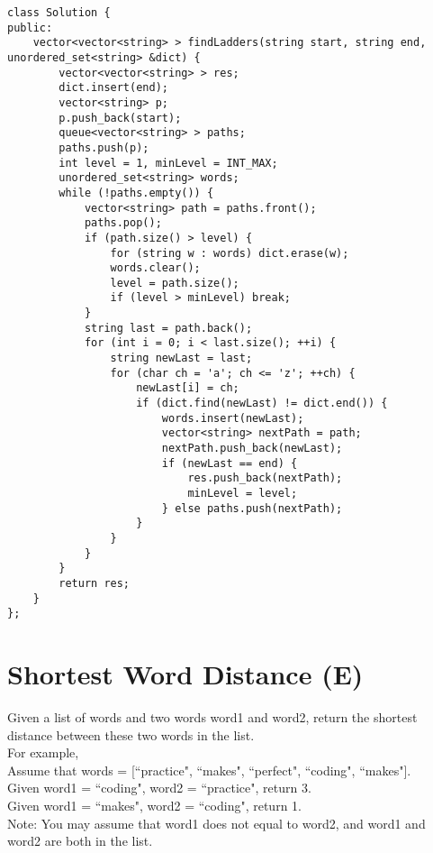\begin{lstlisting}
class Solution {
public:
    vector<vector<string> > findLadders(string start, string end, unordered_set<string> &dict) {
        vector<vector<string> > res;
        dict.insert(end);
        vector<string> p;
        p.push_back(start);
        queue<vector<string> > paths;
        paths.push(p);
        int level = 1, minLevel = INT_MAX;
        unordered_set<string> words;
        while (!paths.empty()) {
            vector<string> path = paths.front();
            paths.pop();
            if (path.size() > level) {
                for (string w : words) dict.erase(w);
                words.clear();
                level = path.size();
                if (level > minLevel) break;
            }
            string last = path.back();
            for (int i = 0; i < last.size(); ++i) {
                string newLast = last;
                for (char ch = 'a'; ch <= 'z'; ++ch) {
                    newLast[i] = ch;
                    if (dict.find(newLast) != dict.end()) {
                        words.insert(newLast);
                        vector<string> nextPath = path;
                        nextPath.push_back(newLast);
                        if (newLast == end) {
                            res.push_back(nextPath);
                            minLevel = level;
                        } else paths.push(nextPath);
                    }
                }
            }            
        }
        return res;
    }
};
\end{lstlisting}


\section{Shortest Word Distance (E)}
Given a list of words and two words word1 and word2, return the shortest distance between these two words in the list.\\

For example,\\
Assume that words = [``practice", ``makes", ``perfect", ``coding", ``makes"].\\
Given word1 = ``coding", word2 = ``practice", return 3.\\
Given word1 = ``makes", word2 = ``coding", return 1.\\

Note: You may assume that word1 does not equal to word2, and word1 and word2 are both in the list.\\

